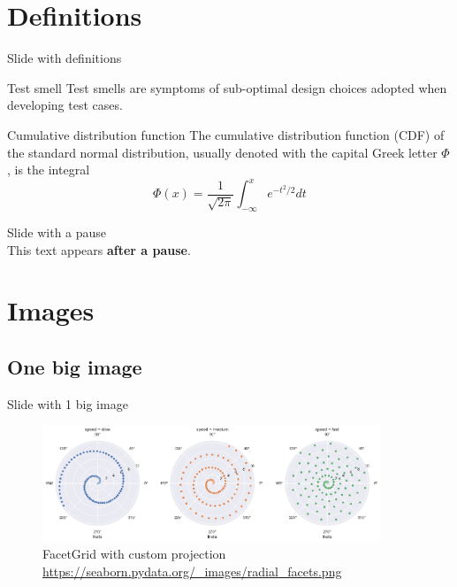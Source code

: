 \documentclass[aspectratio=169, 10pt]{beamer}
\begin{document}
\section{Definitions}
\begin{frame}[fragile]{Slide with definitions}
    \begin{defbox}{Test smell \cite{pontillo2024}}
        Test smells are symptoms of sub-optimal design choices adopted when developing test cases.
    \end{defbox}
    \vspace{0.2cm}
    \begin{defbox}{Cumulative distribution function\cite{wiki:normal_dist}}
        The cumulative distribution function (CDF) of the standard normal distribution, usually denoted with the capital Greek letter $\Phi$, is the integral 
        \begin{equation}
            \Phi(x) = \frac{1}{\sqrt{2\pi}}\int_{-\infty}^{x}{e^{-t^2 / 2}dt}
        \end{equation}
    \end{defbox}
\end{frame}


\begin{frame}[fragile]{Slide with a pause}
    \lipsum[1][1-5]\\[2ex]
    \pause
    \justifying
    This text appears \textbf{after a pause}. \lipsum[1][6-15]
\end{frame}


\section{Images}
\subsection{One big image}
\begin{frame}[fragile]{Slide with 1 big image}
    \justifying
    \begin{figure}[!htbp]%
        \centering
        \includegraphics[width=0.9\textwidth]{images/radial_facets.png}
        \caption{FacetGrid with custom projection\\
        \tiny\url{https://seaborn.pydata.org/_images/radial_facets.png}}
    \end{figure}
\end{frame}
\end{document}
